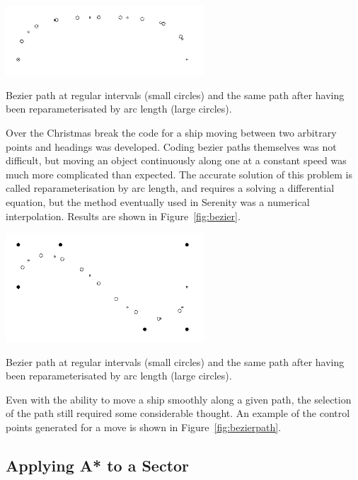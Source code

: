 \begin{marginfigure}
	\includegraphics[width=20em]{res/pathfinding/bezier}
	\caption[Bezier path at regular intervals]{Bezier path at regular intervals (small circles) and the same path after having been reparameterisated by arc length (large circles).}
	\label{fig:bezier}
\end{marginfigure}

Over the Christmas break the code for a ship moving between two arbitrary points and headings was developed. Coding bezier paths themselves was not difficult, but moving an object continuously along one at a constant speed was much more complicated than expected. The accurate solution of this problem is called reparameterisation by arc length, and requires a solving a differential equation, but the method eventually used in Serenity was a numerical interpolation. Results are shown in Figure~\ref{fig:bezier}.

\begin{marginfigure}
	\includegraphics[width=20em]{res/pathfinding/bezierpath}
	\caption[Bezier path at regular intervals]{Bezier path at regular intervals (small circles) and the same path after having been reparameterisated by arc length (large circles).}
	\label{fig:bezierpath}
\end{marginfigure}

Even with the ability to move a ship smoothly along a given path, the selection of the path still required some considerable thought. An example of the control points generated for a move is shown in Figure~\ref{fig:bezierpath}.

\subsection{Applying A* to a Sector}

